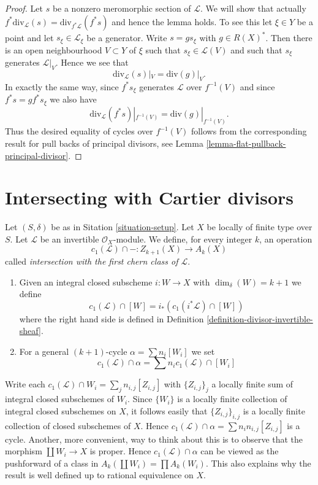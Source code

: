 \begin{proof}
Let $s$ be a nonzero meromorphic section of $\mathcal{L}$.
We will show that actually
$f^*\text{div}_{\mathcal{L}}(s) = \text{div}_{f^*\mathcal{L}}(f^*s)$
and hence the lemma holds.
To see this let $\xi \in Y$ be a point and let $s_\xi \in \mathcal{L}_\xi$
be a generator. Write $s = gs_\xi$ with $g \in R(X)^*$.
Then there is an open neighbourhood $V \subset Y$ of $\xi$
such that $s_\xi \in \mathcal{L}(V)$ and such that $s_\xi$ generates
$\mathcal{L}|_V$. Hence we see that
$$
\text{div}_{\mathcal{L}}(s)|_V = \text{div}(g)|_V.
$$
In exactly the same way, since $f^*s_\xi$ generates $\mathcal{L}$
over $f^{-1}(V)$ and since $f^*s = g f^*s_\xi$ we also
have
$$
\text{div}_{\mathcal{L}}(f^*s)|_{f^{-1}(V)}
=
\text{div}(g)|_{f^{-1}(V)}.
$$
Thus the desired equality of cycles over $f^{-1}(V)$ follows from the
corresponding result for pull backs of principal divisors, see
Lemma \ref{lemma-flat-pullback-principal-divisor}.
\end{proof}



\section{Intersecting with Cartier divisors}
\label{section-intersecting-with-divisors}

\begin{definition}
\label{definition-cap-c1}
Let $(S, \delta)$ be as in Sitation \ref{situation-setup}.
Let $X$ be locally of finite type over $S$.
Let $\mathcal{L}$ be an invertible $\mathcal{O}_X$-module.
We define, for every integer $k$, an operation
$$
c_1(\mathcal{L}) \cap - :
Z_{k + 1}(X) \to A_k(X)
$$
called {\it intersection with the first chern class of $\mathcal{L}$}.
\begin{enumerate}
\item Given an integral closed subscheme $i : W \to X$ with
$\dim_\delta(W) = k + 1$ we define
$$
c_1(\mathcal{L}) \cap [W] = i_*(c_1({i^*\mathcal{L}}) \cap [W])
$$
where the right hand side is defined in
Definition \ref{definition-divisor-invertible-sheaf}.
\item For a general $(k + 1)$-cycle $\alpha = \sum n_i [W_i]$ we set
$$
c_1(\mathcal{L}) \cap \alpha = \sum n_i c_1(\mathcal{L}) \cap [W_i]
$$
\end{enumerate}
\end{definition}

\noindent
Write each $c_1(\mathcal{L}) \cap W_i = \sum_j n_{i,j} [Z_{i, j}]$
with $\{Z_{i, j}\}_j$ a locally finite sum
of integral closed subschemes of $W_i$. Since $\{W_i\}$ is a locally
finite collection of integral closed subschemes on $X$, it follows
easily that $\{Z_{i, j}\}_{i, j}$ is a locally finite collection
of closed subschemes of $X$. Hence
$c_1(\mathcal{L}) \cap \alpha = \sum n_in_{i, j}[Z_{i, j}]$
is a cycle. Another, more convenient, way to think about this
is to observe that the morphism $\coprod W_i \to X$ is
proper. Hence $c_1(\mathcal{L}) \cap \alpha$ can be viewed
as the pushforward of a class in $A_k(\coprod W_i) = \prod A_k(W_i)$.
This also explains why the result is well defined up to rational
equivalence on $X$.

